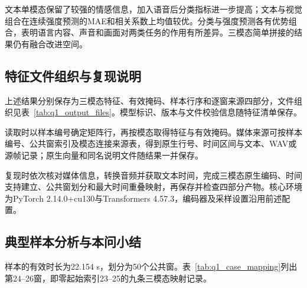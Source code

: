 

\QOneParagraph 文本单模态保留了较强的情感信息，加入语音后分类指标进一步提高；文本与视觉组合在连续强度预测的MAE和相关系数上均值较优。分类与强度预测各有优势组合，表明语言内容、声音和画面对两类任务的作用有所差异。三模态简单拼接的结果仍有融合改进空间。
\subsection{特征文件组织与复现说明}\label{subsec:q1_repro}
\QOneParagraph 上述结果分别保存为三模态特征、有效掩码、样本行序和逐窗来源四部分，文件组织见表~\ref{tab:q1_output_files}。模型标识、版本与文件校验信息随特征清单保存。



\QOneParagraph 读取时以样本编号确定矩阵行，再按模态取得特征与有效掩码。媒体来源可按样本编号、公共窗索引及模态连接来源表，得到原生行号、时间区间与文本、WAV或源帧记录；原生向量和同名说明文件随结果一并保存。

\par


\QOneParagraph 复现时依次核对媒体信息，转换音频并获取文本时间，完成三模态原生编码、时间支持建立、公共窗划分和最大时间重叠映射，再保存并检查四部分产物。核心环境为PyTorch 2.14.0+cu130与Transformers 4.57.3，编码器及采样设置沿用前述配置。
\subsection{典型样本分析与本问小结}\label{subsec:q1_case_summary}
\QOneParagraph 样本\texttt{}的有效时长为22.154 s，划分为50个公共窗。表~\ref{tab:q1_case_mapping}列出第24--26窗，即零起始索引23--25的九条三模态映射记录。









